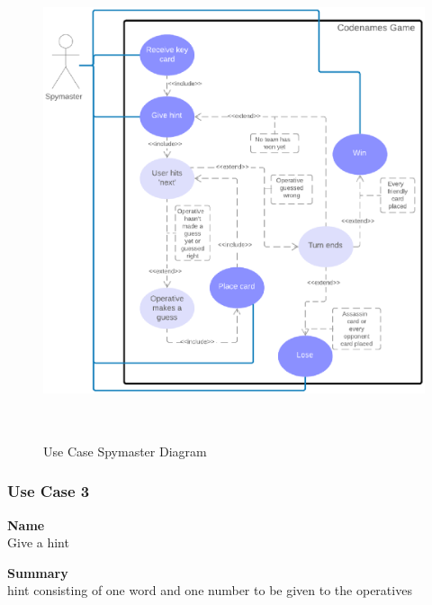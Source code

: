\documentclass[12pt]{article}
\begin{document}
\begin{figure}[htbp]
\centering
\includegraphics[width=16cm,height=14cm]{spymaster_ucd}
\caption{Use Case Spymaster Diagram}
\label{fig:use-case-spymaster}
\end{figure}
\newpage


\subsubsection{Use Case 3} \label{uc:3}

\noindent
{\bf Name}\\
Give a hint

\noindent
{\bf Summary}\\
hint consisting of one word and one number to be given to the operatives
\end{document}

